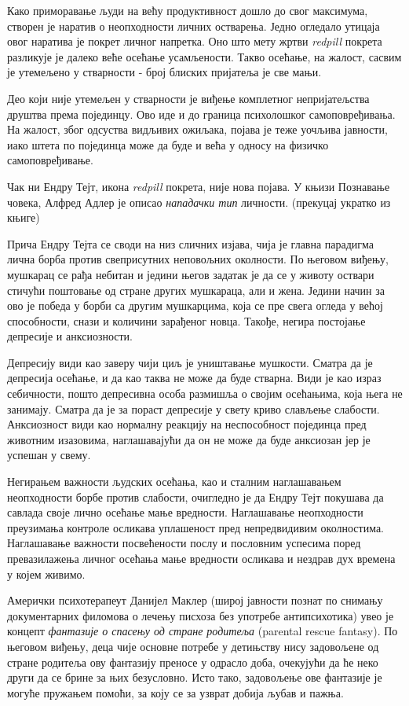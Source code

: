 \documentclass[b5paper]{article}
\begin{document}
Како приморавање људи на већу продуктивност дошло до свог максимума, створен је наратив о неопходности личних остварења. Једно огледало утицаја овог наратива је покрет личног напретка. Оно што мету жртви \textit{redpill} покрета разликује је далеко веће осећање усамљености. Такво осећање, на жалост, сасвим је утемељено у стварности - број блиских пријатеља је све мањи.

Део који није утемељен у стварности је виђење комплетног непријатељства друштва према појединцу. Ово иде и до граница психолошког самоповређивања. На жалост, због одсуства видљивих ожиљака, појава је теже уочљива јавности, иако штета по појединца може да буде и већа у односу на физичко самоповређивање.

Чак ни Ендру Тејт, икона \textit{redpill} покрета, није нова појава. У књизи Познавање човека, Алфред Адлер је описао \textit{нападачки тип} личности. (прекуцај укратко из књиге)

Прича Ендру Тејта се своди на низ сличних изјава, чија је главна парадигма лична борба против свеприсутних неповољних околности. По његовом виђењу, мушкарац се рађа небитан и једини његов задатак је да се у животу оствари стичући поштовање од стране других мушкараца, али и жена. Једини начин за ово је победа у борби са другим мушкарцима, која се пре свега огледа у већој способности, снази и количини зарађеног новца. Такође, негира постојање депресије и анксиозности.

Депресију види као заверу чији циљ је уништавање мушкости. Сматра да је депресија осећање, и да као таква не може да буде стварна. Види је као израз себичности, пошто депресивна особа размишља о својим осећањима, која њега не занимају. Сматра да је за пораст депресије у свету криво слављење слабости. Анксиозност види као нормалну реакцију на неспособност појединца пред животним изазовима, наглашавајући да он не може да буде анксиозан јер је успешан у свему.

Негирањем важности људских осећања, као и сталним наглашавањем неопходности борбе против слабости, очигледно је да Ендру Тејт покушава да савлада своје лично осећање мање вредности. Наглашавање неопходности преузимања контроле осликава уплашеност пред непредвидивим околностима. Наглашавање важности посвећености послу и пословним успесима поред превазилажења личног осећања мање вредности осликава и нездрав дух времена у којем живимо.

Амерички психотерапеут Данијел Маклер (широј јавности познат по снимању документарних филомова о лечењу писхоза без употребе антипсихотика) увео је концепт \textit{фантазије о спасењу од стране родитеља} (parental rescue fantasy). По његовом виђењу, деца чије основне потребе у детињству нису задовољене од стране родитеља ову фантазију преносе у одрасло доба, очекујући да ће неко други да се брине за њих безусловно. Исто тако, задовољење ове фантазије је могуће пружањем помоћи, за коју се за узврат добија љубав и пажња.
\end{document}
